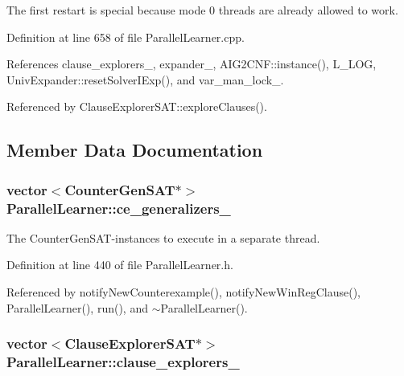The first restart is special because mode 0 threads are already allowed to work. 



Definition at line 658 of file Parallel\-Learner.\-cpp.



References clause\-\_\-explorers\-\_\-, expander\-\_\-, A\-I\-G2\-C\-N\-F\-::instance(), L\-\_\-\-L\-O\-G, Univ\-Expander\-::reset\-Solver\-I\-Exp(), and var\-\_\-man\-\_\-lock\-\_\-.



Referenced by Clause\-Explorer\-S\-A\-T\-::explore\-Clauses().



\subsection{Member Data Documentation}
\hypertarget{classParallelLearner_a46cc16764d7ea8ffafe8d1b696c35df3}{
\subsubsection[{ce\-\_\-generalizers\-\_\-}]{\setlength{\rightskip}{0pt plus 5cm}vector$<${\bf Counter\-Gen\-S\-A\-T}$\ast$$>$ Parallel\-Learner\-::ce\-\_\-generalizers\-\_\-\hspace{0.3cm}{\ttfamily [protected]}}}\label{classParallelLearner_a46cc16764d7ea8ffafe8d1b696c35df3}


The Counter\-Gen\-S\-A\-T-\/instances to execute in a separate thread. 



Definition at line 440 of file Parallel\-Learner.\-h.



Referenced by notify\-New\-Counterexample(), notify\-New\-Win\-Reg\-Clause(), Parallel\-Learner(), run(), and $\sim$\-Parallel\-Learner().

\hypertarget{classParallelLearner_a0e8b5dd12c8ae14089d3ce3117da3c16}{
\subsubsection[{clause\-\_\-explorers\-\_\-}]{\setlength{\rightskip}{0pt plus 5cm}vector$<${\bf Clause\-Explorer\-S\-A\-T}$\ast$$>$ Parallel\-Learner\-::clause\-\_\-explorers\-\_\-\hspace{0.3cm}{\ttfamily [protected]}}}\label{classParallelLearner_a0e8b5dd12c8ae14089d3ce3117da3c16}


